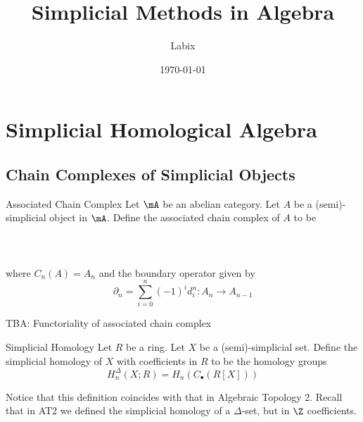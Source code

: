 \documentclass[a4paper]{article}
\title{Simplicial Methods in Algebra}
\author{Labix}
\date{\today}
\begin{document}
\maketitle

\pagebreak
\tableofcontents

\pagebreak
\section{Simplicial Homological Algebra}
\subsection{Chain Complexes of Simplicial Objects}
\begin{defn}{Associated Chain Complex}{} Let $\mA$ be an abelian category. Let $A$ be a (semi)-simplicial object in $\mA$. Define the associated chain complex of $A$ to be \\~\\
\\~\\
where $C_n(A)=A_n$ and the boundary operator given by $$\partial_n=\sum_{i=0}^n(-1)^id_i^n:A_n\to A_{n-1}$$
\end{defn}

TBA: Functoriality of associated chain complex

\begin{defn}{Simplicial Homology}{} Let $R$ be a ring. Let $X$ be a (semi)-simplicial set. Define the simplicial homology of $X$ with coefficients in $R$ to be the homology groups $$H_n^\Delta(X;R)=H_n(C_\bullet(R[X]))$$
\end{defn}

Notice that this definition coincides with that in Algebraic Topology 2. Recall that in AT2 we defined the simplicial homology of a $\Delta$-set, but in $\Z$ coefficients. 
\end{document}
